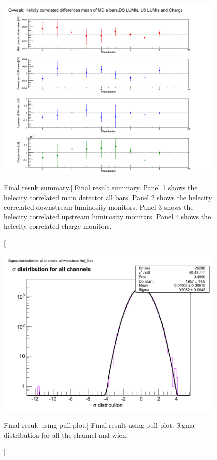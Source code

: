 \begin{singlespace}
\begin{figure}[h]
	\centering
	\includegraphics[width=15.0cm]{figures/final_sum_combined_ped_plot}
	\caption
	[Final result summary.]
	{Final result summary. Panel 1 shows the helecity correlated main detector all bars. Panel 2 shows the helecity correlated downstream luminosity monitors. Panel 3 shows the helecity correlated upstream luminosity monitors. Panel 4 shows the helecity correlated charge monitors.}
	\label{fig:final_sum_combined_ped_plot}
\end{figure}
\end{singlespace}

\begin{singlespace}
\begin{figure}[h]
	\centering
	\includegraphics[width=15.0cm]{FIGURES/HelCorDiffSigmaDistribution}
	\caption
	[Final result using pull plot.]
	{Final result using pull plot. Sigma  distribution for all the channel and wien.}
	\label{fig:HelCorDiffSigmaDistribution}
\end{figure}
\end{singlespace}

